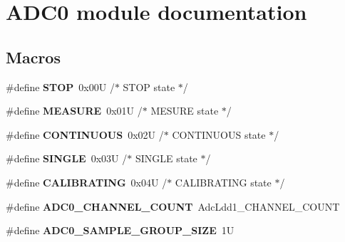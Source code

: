 \hypertarget{group___a_d_c0__module}{}\section{A\+D\+C0 module documentation}
\label{group___a_d_c0__module}
\subsection*{Macros}
\begin{DoxyCompactItemize}
\item 
\mbox{\label{group___a_d_c0__module_gae19b6bb2940d2fbe0a79852b070eeafd}} 
\#define {\bfseries S\+T\+OP}~0x00\+U          /$\ast$ S\+T\+O\+P state           $\ast$/
\item 
\mbox{\label{group___a_d_c0__module_ga4691aeea76a4f3a3bdbff68ce5ab56a1}} 
\#define {\bfseries M\+E\+A\+S\+U\+RE}~0x01\+U          /$\ast$ M\+E\+S\+U\+R\+E state         $\ast$/
\item 
\mbox{\label{group___a_d_c0__module_gacf80826c205230fbc6a84ab9c46ff9af}} 
\#define {\bfseries C\+O\+N\+T\+I\+N\+U\+O\+US}~0x02\+U          /$\ast$ C\+O\+N\+T\+I\+N\+U\+O\+U\+S state     $\ast$/
\item 
\mbox{\label{group___a_d_c0__module_gaae597f206a8cf88b5a0593f39044b937}} 
\#define {\bfseries S\+I\+N\+G\+LE}~0x03\+U          /$\ast$ S\+I\+N\+G\+L\+E state         $\ast$/
\item 
\mbox{\label{group___a_d_c0__module_ga26c3762ed87f9dd7c55b86b162e8461f}} 
\#define {\bfseries C\+A\+L\+I\+B\+R\+A\+T\+I\+NG}~0x04\+U          /$\ast$ C\+A\+L\+I\+B\+R\+A\+T\+I\+N\+G state    $\ast$/
\item 
\mbox{\label{group___a_d_c0__module_gae4ecae6aecf90a0949a29d7578d4b265}} 
\#define {\bfseries A\+D\+C0\+\_\+\+C\+H\+A\+N\+N\+E\+L\+\_\+\+C\+O\+U\+NT}~Adc\+Ldd1\+\_\+\+C\+H\+A\+N\+N\+E\+L\+\_\+\+C\+O\+U\+NT
\item 
\mbox{\label{group___a_d_c0__module_ga193a0753076ecf7daa647af4ede30fab}} 
\#define {\bfseries A\+D\+C0\+\_\+\+S\+A\+M\+P\+L\+E\+\_\+\+G\+R\+O\+U\+P\+\_\+\+S\+I\+ZE}~1U
\end{DoxyCompactItemize}
